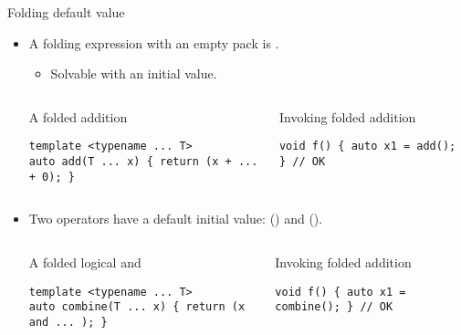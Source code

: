 \begin{frame}[t,fragile]{Folding default value}
\begin{itemize}
  \item A folding expression with an empty pack is .
    \begin{itemize}
      \item Solvable with an initial value.
    \end{itemize}

\begin{columns}[T]

\begin{block}{A folded addition}
\begin{lstlisting}
template <typename ... T>
auto add(T ... x) { return (x + ... + 0); }
\end{lstlisting}
\end{block}

\begin{block}{Invoking folded addition}
\begin{lstlisting}
void f() { auto x1 = add(); } // OK
\end{lstlisting}
\end{block}

\end{columns}

  \item Two operators have a default initial value: 
         () and  ().
\begin{columns}[T]

\begin{block}{A folded logical and}
\begin{lstlisting}
template <typename ... T>
auto combine(T ... x) { return (x and ... ); }
\end{lstlisting}
\end{block}

\begin{block}{Invoking folded addition}
\begin{lstlisting}
void f() { auto x1 = combine(); } // OK
\end{lstlisting}
\end{block}

\end{columns}


\end{itemize}
\end{frame}


